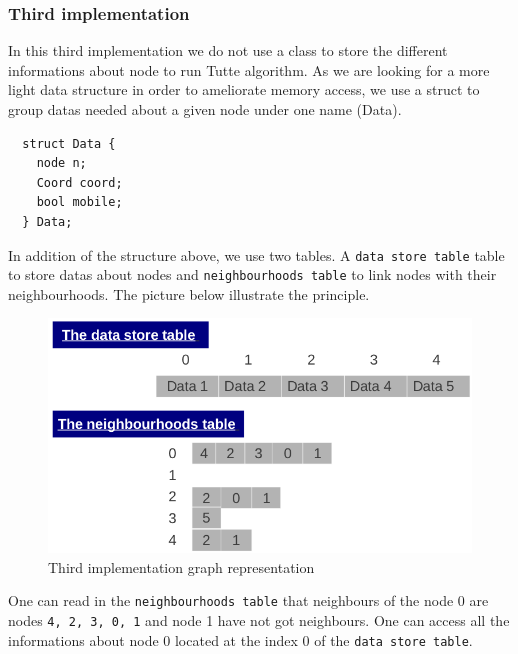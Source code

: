 \subsubsection{Third implementation}
In this third implementation we do not use a class to store the
different informations about node to run Tutte algorithm. 
As we are looking for a more light data structure in order to ameliorate 
memory access, we use a \textsf{struct} to group datas needed about a given node
under one name (\textsf{Data}). 
\begin{lstlisting}
  struct Data {
    node n;
    Coord coord;
    bool mobile;
  } Data;
\end{lstlisting}
In addition of the structure above, we use two tables. A \texttt{data store table} table to store datas about nodes and \texttt{neighbourhoods table} to link nodes with their neighbourhoods. The picture below illustrate the principle.
\begin {figure}[H]
  \centering
  \includegraphics[scale=0.5]{img/struct3.png}
  \caption{Third implementation graph representation}
  \label{struct3}
\end {figure}
\noindent One can read in the \texttt{neighbourhoods table} that neighbours of the node 0 are nodes \texttt{4, 2, 3, 0, 1} and node 1 have not got neighbours. One can access all the informations about node 0 located at the index 0 of the \texttt{data store table}.  
